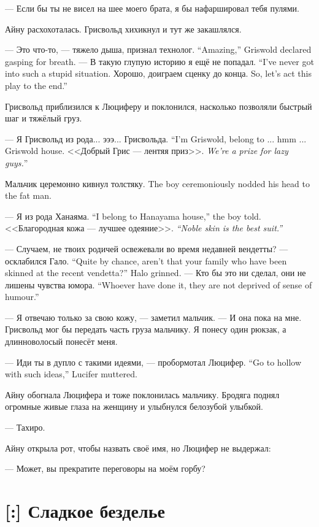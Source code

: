 --- Если бы ты не висел на шее моего брата, я бы нафаршировал тебя пулями.

Айну расхохоталась.
Грисвольд хихикнул и тут же закашлялся.

{--- Это что-то, --- тяжело дыша, признал технолог.}
{``Amazing,'' Griswold declared gasping for breath.}
{--- В такую глупую историю я ещё не попадал.}
{``I’ve never got into such a stupid situation.}
{Хорошо, доиграем сценку до конца.}
{So, let’s act this play to the end.''}

Грисвольд приблизился к Люциферу и поклонился, насколько позволяли быстрый шаг и тяжёлый груз.

{--- Я Грисвольд из рода... эээ... Грисвольда.}
{``I’m Griswold, belong to ... hmm ... Griswold house.}
{<<Добрый Грис --- лентяя приз>>.}
{\emph{We're a prize for lazy guys.}''}

{Мальчик церемонно кивнул толстяку.}
{The boy ceremoniously nodded his head to the fat man.}

{--- Я из рода Ханаяма.}
{``I belong to Hanayama house,'' the boy told.}
{<<Благородная кожа --- лучшее одеяние>>.}
{\emph{``Noble skin is the best suit.''}}

{--- Случаем, не твоих родичей освежевали во время недавней вендетты? --- осклабился Гало.}
{``Quite by chance, aren't that your family who have been skinned at the recent vendetta?'' Halo grinned.}
{--- Кто бы это ни сделал, они не лишены чувства юмора.}
{``Whoever have done it, they are not deprived of sense of humour.''}

--- Я отвечаю только за свою кожу, --- заметил мальчик.
--- И она пока на мне.
Грисвольд мог бы передать часть груза мальчику.
Я понесу один рюкзак, а длинноволосый понесёт меня.

{--- Иди ты в дупло с такими идеями, --- пробормотал Люцифер.}
{``Go to hollow with such ideas,'' Lucifer muttered.}

Айну обогнала Люцифера и тоже поклонилась мальчику.
Бродяга поднял огромные живые глаза на женщину и улыбнулся белозубой улыбкой.

--- Тахиро.

Айну открыла рот, чтобы назвать своё имя, но Люцифер не выдержал:

--- Может, вы прекратите переговоры на моём горбу?

\section{[:] Сладкое безделье}

